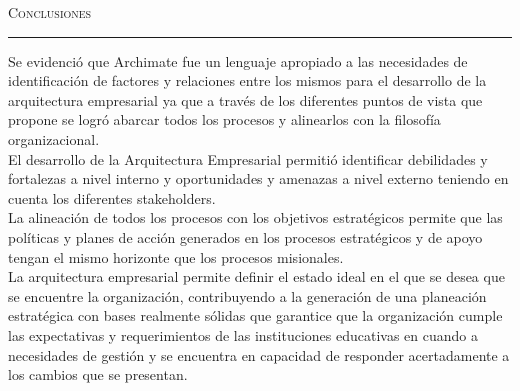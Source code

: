 \vspace*{3cm}
\noindent\Huge\textsc{Conclusiones}\\
\normalsize
\noindent\rule[2pt]{\textwidth}{0.8pt}
\hspace*{3cm}

Se evidenció que Archimate fue un lenguaje apropiado a las necesidades de identificación de factores y relaciones entre los mismos para el desarrollo de la arquitectura empresarial ya que a través de los diferentes puntos de vista que propone se logró abarcar todos los procesos y alinearlos con la filosofía organizacional. \\

El desarrollo de la Arquitectura Empresarial permitió identificar debilidades y fortalezas a nivel interno y oportunidades y amenazas a nivel externo teniendo en cuenta los diferentes stakeholders. \\

La alineación de todos los procesos con los objetivos estratégicos permite que las políticas y planes de acción generados en los procesos estratégicos y de apoyo tengan el mismo horizonte que los procesos misionales. \\

La arquitectura empresarial permite definir el estado ideal en el que se desea que se encuentre la organización, contribuyendo a la generación de una planeación estratégica con bases realmente sólidas que garantice que la organización cumple las expectativas y requerimientos de las instituciones educativas en cuando a necesidades de gestión y se encuentra en capacidad de responder acertadamente a los cambios que se presentan.